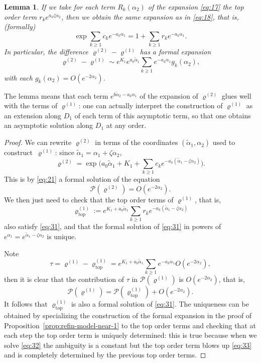 \documentclass[JEP,XML,SOM,Unicode, NoEqCountersInSection, NoFloatCountersInSection]{cedram}
\newcommand{\topo}{\mathrm{top}}
\theoremstyle{plain}
\newtheorem{lem}[thm]{Lemma}
\theoremstyle{definition}
\newcommand{\ta}{\tilde \alpha}
\newcommand{\opP}{\mathcal{P}}
\newcommand{\rhodeux}{\varrho^{(2)}}
\newcommand{\rhoun}{\varrho^{(1)}}
\begin{document}
\begin{lem}
\label{lem:est-diff}
If we take for each term $R_k(\alpha_2)$ of the expansion \eqref{eq:17} the top order term $r_ke^{a_k\zeta \alpha_2}$, then we obtain the same expansion as in \eqref{eq:18}, that is, (formally)
\[ \exp \sum_{k\ge1} c_k e^{-a_k\alpha_1} = 1+\sum_{k\geq1} r_k e^{-a_k\alpha_1}. \]
In particular, the difference $\rhodeux-\rhoun$ has a formal expansion
\[ \rhodeux - \rhoun \sim e^{K_1}e^{a_0\ta_1} \sum_{k\geq1} e^{-a_k\alpha_1} g_k(\alpha_2),\]
with each $g_k(\alpha_2)=O(e^{-2\alpha_2})$.
\end{lem}

The lemma means that each term $e^{b\ta_2-a_k\alpha_1}$ of the expansion of $\rhodeux$ glues well with the terms of $\rhoun$: one can actually interpret the construction of $\rhoun$ as an extension along $D_1$ of each term of this asymptotic term, so that one obtains an asymptotic solution along $D_1$ at any order.

\begin{proof}
We can rewrite $\varrho^{(2)}$ in terms of the coordinates $(\tilde\alpha_1,\alpha_2)$ used to construct~$\varrho^{(1)}$: since $\tilde\alpha_1=\alpha_1+\zeta\alpha_2$,
\[ \varrho^{(2)}=\exp\Big(a_0\tilde\alpha_1+K_1+\sum_{k\geq1}c_ke^{-a_k(\tilde\alpha_1-\zeta\alpha_2)}\Big).\]
This is by \eqref{eq:21} a formal solution of the equation
\begin{equation}
\opP(\varrho^{(2)}) = O(e^{-2\alpha_2}).\label{eq:31}
\end{equation}
We then just need to check that the top order terms of $\varrho^{(1)}$, that is,
\[ \varrho^{(1)}_{\topo} := e^{K_1+a_0\tilde\alpha_1} \sum_{k\geq1} r_k e^{-a_k(\tilde\alpha_1-\zeta\alpha_2)} \]
also satisfy \eqref{eq:31}, and that the formal solution of \eqref{eq:31} in powers of $e^{\alpha_1}=e^{\tilde\alpha_1-\zeta\alpha_2}$ is unique.

Note \[ \tau=\varrho^{(1)}-\varrho^{(1)}_{\topo}=e^{K_1+a_0\tilde\alpha_1}\sum_{k\geq1}e^{-a_k\alpha_1}O(e^{-2\alpha_2}), \]
then it is clear that the contribution of $\tau$ in $\opP(\varrho^{(1)})$ is $O(e^{-2\alpha_2})$, that is,
\[ \opP(\varrho^{(1)}) = \opP(\varrho^{(1)}_{\topo}) + O(e^{-2\alpha_2}). \]
It follows that $\varrho^{(1)}_{\topo}$ is also a formal solution of \eqref{eq:31}. The uniqueness can be obtained by specializing the construction of the formal expansion in the proof of Proposition~\ref{prop:refin-model-near-1} to the top order terms and checking that at each step the top order term is uniquely determined: this is true because when we solve \eqref{eq:32} the ambiguity is a constant but the top order term blows up \eqref{eq:33} and is completely determined by the previous top order terms.
\end{proof}
\end{document}
